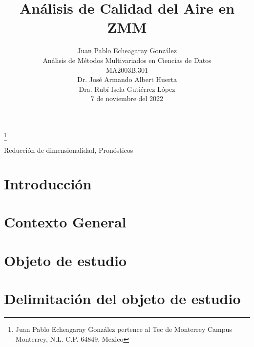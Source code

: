 \documentclass[journal]{IEEEtran}
\title{\LARGE \bf Análisis de Calidad del Aire en ZMM}
\author{Juan Pablo Echeagaray González \\
Análisis de Métodos Multivariados en Ciencias de Datos \\
MA2003B.301 \\
Dr. José Armando Albert Huerta \\
Dra. Rubí Isela Gutiérrez López \\
7 de noviembre del 2022}%
\begin{document}
    \thanks{Juan Pablo Echeagaray González pertence al Tec de Monterrey Campus Monterrey, N.L. C.P. 64849, Mexico {\tt\small}}

    \maketitle

    \thispagestyle{empty}
    \pagestyle{empty}

    \begin{abstract}
    \end{abstract}

    \begin{IEEEkeywords}
        Reducción de dimensionalidad, Pronósticos
    \end{IEEEkeywords}

    \section{Introducción}


    \section{Contexto General}


    \section{Objeto de estudio}


    \section{Delimitación del objeto de estudio}
\end{document}
